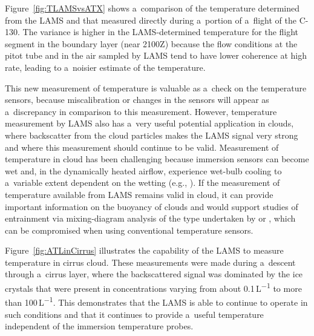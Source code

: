 \documentclass[amtd, online, hvmath]{copernicus}
\begin{document}
Figure~\ref{fig:TLAMSvsATX} shows a~comparison of the temperature
determined from the LAMS and that measured directly during a~portion
of a~flight of the C-130. The variance is higher in the
LAMS-determined temperature for the flight segment in the boundary
layer (near 2100Z) because the flow conditions at the pitot tube and
in the air sampled by LAMS tend to have lower coherence at high rate,
leading to a~noisier estimate of the temperature.

This new measurement of temperature is valuable as a~check on the
temperature sensors, because miscalibration or changes in the sensors
will appear as a~discrepancy in comparison to this
measurement. However, temperature measurement by LAMS also has a~very
useful potential application in clouds, where backscatter from the
cloud particles makes the LAMS signal very strong and where this
measurement should continue to be valid. Measurement of temperature in
cloud has been challenging because immersion sensors can become wet
and, in the dynamically heated airflow, experience wet-bulb cooling to
a~variable extent dependent on the wetting (e.g.,
\citealp{heymsJAM79,WangGeertz2009}).  If the measurement of
temperature available from LAMS remains valid in cloud, it can provide
important information on the buoyancy of clouds and would support
studies of entrainment via mixing-diagram analysis of the type
undertaken by \citet{paluch1979} or \citet{betts:1983}, which can be
compromised when using conventional temperature sensors.

Figure~\ref{fig:ATLinCirrus} illustrates the capability of the LAMS to
measure temperature in cirrus cloud. These measurements were made
during a~descent through a~cirrus layer, where the backscattered
signal was dominated by the ice crystals that were present in
concentrations varying from about 0.1\,\unit{L^{-1}} to more than
100\,\unit{L^{-1}}.  This demonstrates that the LAMS is able to
continue to operate in such conditions and that it continues to
provide a~useful temperature independent of the immersion temperature
probes.
\end{document}
